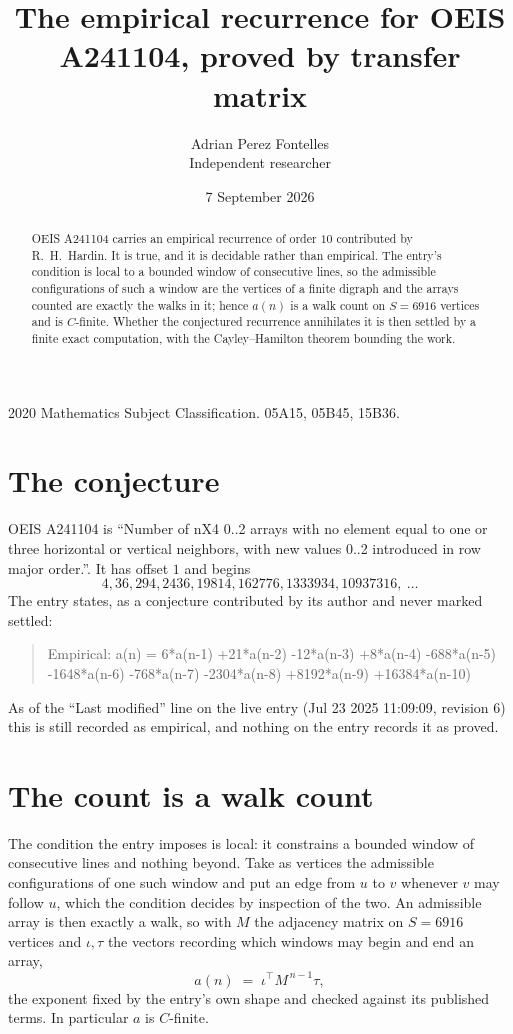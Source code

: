 \documentclass[11pt,a4paper]{article}
\title{The empirical recurrence for OEIS A241104, proved by transfer matrix}
\author{Adrian Perez Fontelles\\ \small Independent researcher}
\date{7 September 2026}
\theoremstyle{plain}
\theoremstyle{definition}
\begin{document}
\maketitle

\begin{abstract}
OEIS A241104 carries an empirical recurrence of order $10$ contributed by R.~H.~Hardin. It is
true, and it is decidable rather than empirical. The entry's condition is local to a bounded window of consecutive lines, so
the admissible configurations of such a window are the vertices of a finite digraph and the
arrays counted are exactly the walks in it; hence $a(n)$ is a walk count on $S=6916$ vertices
and is $C$-finite. Whether the conjectured recurrence annihilates it is then settled by a
finite exact computation, with the Cayley--Hamilton theorem bounding the work.
\end{abstract}

\noindent\small 2020 Mathematics Subject Classification. 05A15, 05B45, 15B36.\normalsize

\section{The conjecture}

OEIS A241104 is ``Number of nX4 0..2 arrays with no element equal to one or three horizontal or vertical neighbors, with new values 0..2 introduced in row major order.''. It has offset $1$ and begins
\[
4, 36, 294, 2436, 19814, 162776, 1333934, 10937316,\ \dots
\]
The entry states, as a conjecture contributed by its author and never marked settled:
\begin{quote}
Empirical: a(n) = 6*a(n-1) +21*a(n-2) -12*a(n-3) +8*a(n-4) -688*a(n-5) -1648*a(n-6) -768*a(n-7) -2304*a(n-8) +8192*a(n-9) +16384*a(n-10)
\end{quote}
As of the ``Last modified'' line on the live entry (Jul 23 2025 11:09:09, revision 6) this is still
recorded as empirical, and nothing on the entry records it as proved.

\section{The count is a walk count}

The condition the entry imposes is local: it constrains a bounded window of consecutive lines and nothing beyond. Take as
vertices the admissible configurations of one such window and put an edge from $u$ to $v$
whenever $v$ may follow $u$, which the condition decides by inspection of the two. An
admissible array is then exactly a walk, so with $M$ the adjacency matrix on $S=6916$ vertices
and $\iota,\tau$ the vectors recording which windows may begin and end an array,
\[
a(n)\;=\;\iota^{\!\top}M^{\,n-1}\tau ,
\]
the exponent fixed by the entry's own shape and checked against its published terms. In
particular $a$ is $C$-finite.
\end{document}
